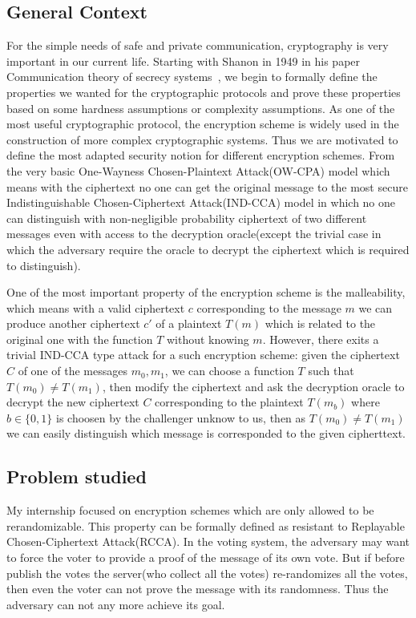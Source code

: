 \subsection*{General Context}

For the simple needs of safe and private communication, cryptography is very important in our current life. 
Starting with Shanon in 1949 in his paper Communication theory of secrecy systems~\cite{shannon-otp},
we begin to formally define the properties we wanted for the cryptographic protocols and prove these properties based on some hardness assumptions or complexity assumptions.
As one of the most useful cryptographic protocol, the encryption scheme is widely used in the construction of more complex cryptographic systems.
Thus we are motivated to define the most adapted security notion for different encryption schemes. 
From the very basic One-Wayness Chosen-Plaintext Attack(OW-CPA) model which means with the ciphertext no one can get the original message
to the most secure Indistinguishable Chosen-Ciphertext Attack(IND-CCA) model
in which no one can distinguish with non-negligible probability ciphertext of two different messages even with access to the decryption oracle(except the trivial case in which the adversary require the oracle to decrypt the ciphertext which is required to distinguish). 

One of the most important property of the encryption scheme is the malleability, 
which means with a valid ciphertext $c$ corresponding to the message $m$ we can produce another ciphertext $c'$ of a plaintext $T(m)$ which is related to the original one with the function $T$ without knowing $m$.
However, there exits a trivial IND-CCA type attack for a such encryption scheme: given the ciphertext $C$ of one of the messages $m_0, m_1$, we can choose a function $T$ such that $T(m_0) \neq T(m_1)$,
then modify the ciphertext and ask the decryption oracle to decrypt the new ciphertext $C$ corresponding to the plaintext $T(m_b)$ where $b \in \{0,1\}$ is choosen by the challenger unknow to us,
then as $T(m_0) \neq T(m_1)$ we can easily distinguish which message is corresponded to the given cipherttext.

\subsection*{Problem studied}
My internship focused on encryption schemes which are only allowed to be rerandomizable.
This property can be formally defined as resistant to Replayable Chosen-Ciphertext Attack(RCCA).
In the voting system,
the adversary may want to force the voter to provide a proof of the message of its own vote.
But if before publish the votes the server(who collect all the votes) re-randomizes all the votes,
then even the voter can not prove the message with its randomness.
Thus the adversary can not any more achieve its goal.

